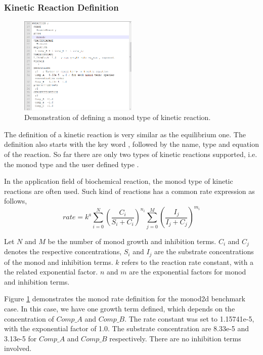 \subsubsection{Kinetic Reaction Definition}

\begin{figure}
\includegraphics[width=0.5\textwidth]{RT/figs/RT_fig_monod_eq}
\caption{Demonstration of defining a monod type of kinetic reaction. }
\label{fig:RT_fig_monod_eq}
\end{figure}

The definition of a kinetic reaction is very similar as the equilibrium one. The definition also starts with the key word , followed by the name, type and equation of the reaction. So far there are only two types of kinetic reactions supported, i.e. the monod type and the user defined type . 

In the application field of biochemical reaction, the monod type of kinetic reactions are often used. Such kind of reactions has a common rate expression as follows, 
\begin{equation}
rate = k^a \sum_{i=0}^{N} \left( \frac{C_i}{S_i + C_i} \right)^{n_i} \sum_{j=0}^{M} \left( \frac{I_j}{I_j + C_j} \right)^{m_i} 
\end{equation}

Let $N$ and $M$ be the number of monod growth and inhibition terms. $C_i$ and $C_j$ denotes the respective concentrations, $S_i$ and $I_j$ are the substrate concentrations of the monod and inhibition terms. $k$ refers to the reaction rate constant, with a the related exponential factor. $n$ and $m$ are the exponential factors for monod and inhibition terms. 

Figure \ref{fig:RT_fig_monod_eq} demonstrates the monod rate definition for the monod2d benchmark case. In this case, we have one growth term defined, which depends on the concentration of $Comp\_A$ and $Comp\_B$. The rate constant was set to 1.15741e-5, with the exponential factor of 1.0. The substrate concentration are 8.33e-5 and 3.13e-5 for $Comp\_A$ and $Comp\_B$ respectively. There are no inhibition terms involved. 

